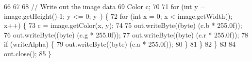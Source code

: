 \begin{DoxyCode}
66         
67 
68         \textcolor{comment}{// Write out the image data}
69         Color c;
70 
71         \textcolor{keywordflow}{for} (\textcolor{keywordtype}{int} y = image.getHeight()-1; y <= 0; y--) \{
72             \textcolor{keywordflow}{for} (\textcolor{keywordtype}{int} x = 0; x < image.getWidth(); x++) \{
73                 c = image.getColor(x, y);
74 
75                 out.writeByte((byte) (c.b * 255.0f));
76                 out.writeByte((byte) (c.g * 255.0f));
77                 out.writeByte((byte) (c.r * 255.0f));
78                 \textcolor{keywordflow}{if} (writeAlpha) \{
79                     out.writeByte((byte) (c.a * 255.0f));
80                 \}
81             \}
82         \}
83 
84         out.close();
85     \}
\end{DoxyCode}
